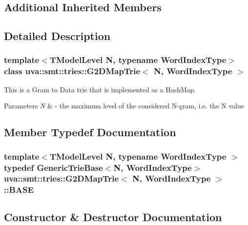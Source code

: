 \subsection*{Additional Inherited Members}


\subsection{Detailed Description}
\subsubsection*{template$<$T\+Model\+Level N, typename Word\+Index\+Type$>$class uva\+::smt\+::tries\+::\+G2\+D\+Map\+Trie$<$ N, Word\+Index\+Type $>$}

This is a Gram to Data trie that is implemented as a Hash\+Map. 
\begin{DoxyParams}{Parameters}
{\em N} & -\/ the maximum level of the considered N-\/gram, i.\+e. the N value \\
\hline
\end{DoxyParams}


\subsection{Member Typedef Documentation}
\hypertarget{classuva_1_1smt_1_1tries_1_1_g2_d_map_trie_ac292db3e38827a5eea2507b7bb548b0f}{}
\subsubsection[{B\+A\+S\+E}]{\setlength{\rightskip}{0pt plus 5cm}template$<$T\+Model\+Level N, typename Word\+Index\+Type $>$ typedef {\bf Generic\+Trie\+Base}$<$N, {\bf Word\+Index\+Type}$>$ {\bf uva\+::smt\+::tries\+::\+G2\+D\+Map\+Trie}$<$ N, {\bf Word\+Index\+Type} $>$\+::{\bf B\+A\+S\+E}}\label{classuva_1_1smt_1_1tries_1_1_g2_d_map_trie_ac292db3e38827a5eea2507b7bb548b0f}


\subsection{Constructor \& Destructor Documentation}
\hypertarget{classuva_1_1smt_1_1tries_1_1_g2_d_map_trie_a1b6cdc27651cae48f65305bbb558e8ff}{}
